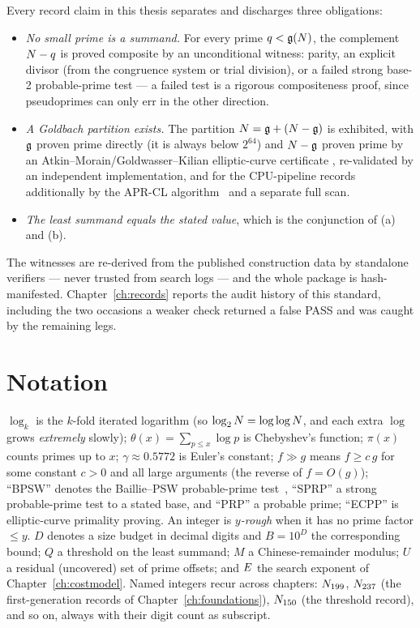 Every record claim in this thesis separates and discharges three
obligations:
\begin{itemize}
\item[\emph{(a)}] \emph{No small prime is a summand.} For every prime
  $q<\mathfrak{g}(N)$, the complement $N-q$ is proved composite by an
  unconditional witness: parity, an explicit divisor (from the
  congruence system or trial division), or a failed strong base-2
  probable-prime test --- a failed test is a rigorous compositeness
  proof, since pseudoprimes can only err in the other direction.
\item[\emph{(b)}] \emph{A Goldbach partition exists.} The partition
  $N=\mathfrak{g}+(N-\mathfrak{g})$ is exhibited, with $\mathfrak{g}$ proven prime directly (it is
  always below $2^{64}$) and $N-\mathfrak{g}$ proven prime by an
  Atkin--Morain/Goldwasser--Kilian elliptic-curve certificate
  \cite{GoldwasserKilian,AtkinMorain}, re-validated by an independent
  implementation, and for the CPU-pipeline records additionally by the
  APR-CL algorithm~\cite{APRCL} and a separate full scan.
\item[\emph{(c)}] \emph{The least summand equals the stated value},
  which is the conjunction of (a) and (b).
\end{itemize}
The witnesses are re-derived from the published construction data by
standalone verifiers --- never trusted from search logs --- and the whole
package is hash-manifested. Chapter~\ref{ch:records} reports the audit
history of this standard, including the two occasions a weaker check
returned a false PASS and was caught by the remaining legs.

\section{Notation}

$\log_k$ is the $k$-fold iterated logarithm (so $\log_2N=\log\log N$,
and each extra $\log$ grows \emph{extremely} slowly);
$\theta(x)=\sum_{p\le x}\log p$ is Chebyshev's function;
$\pi(x)$ counts primes up to $x$; $\gamma\approx0.5772$ is Euler's
constant; $f\gg g$ means $f\ge c\,g$ for some constant $c>0$ and all
large arguments (the reverse of $f=O(g)$); ``BPSW'' denotes the
Baillie--PSW probable-prime test~\cite{PSW,BW}, ``SPRP'' a strong
probable-prime test to a stated base, and ``PRP'' a probable prime;
``ECPP'' is elliptic-curve primality proving. An integer is
\emph{$y$-rough} when it has no prime factor $\le y$. $D$ denotes a
size budget in decimal digits and $B=10^{D}$ the corresponding bound;
$Q$ a threshold on the least summand; $M$ a Chinese-remainder modulus;
$U$ a residual (uncovered) set of prime offsets; and $E$ the search
exponent of Chapter~\ref{ch:costmodel}. Named integers recur across
chapters: $N_{199}$, $N_{237}$ (the first-generation records of
Chapter~\ref{ch:foundations}), $N_{150}$ (the threshold record), and
so on, always with their digit count as subscript.
